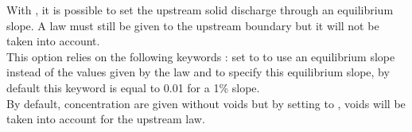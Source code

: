 With \Cbedload, it is possible to set the upstream solid discharge through an equilibrium slope. A law must still be given to the upstream boundary but it will not be taken into account. \\

This option relies on the following keywords :  set to  to use an equilibrium slope instead of the values given by the law and  to specify this equilibrium slope, by default this keyword is equal to 0.01 for a 1\% slope. \\

By default, concentration are given without voids but by setting  to , voids will be taken into account for the upstream law.
